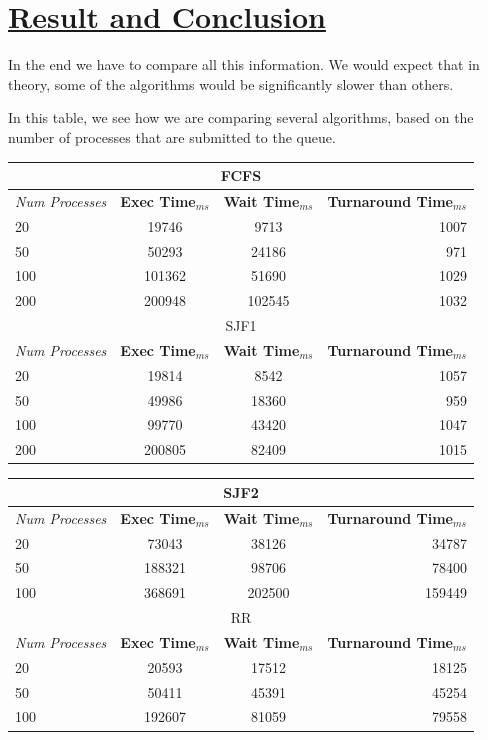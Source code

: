 \documentclass{article}
\begin{document}
\section{\underline{Result and Conclusion}}

In the end we have to compare all this information. We would expect that in theory, some of the algorithms would be significantly slower than others.

In this table, we see how we are comparing several algorithms, based on the number of processes that are submitted to the queue.

\begin{center}
  \begin{tabular}{l|c|c|r}
    \multicolumn{4}{c}{FCFS} \\
    \toprule
    \textit{Num Processes} & \textbf{Exec Time}$_{ms}$ & \textbf{Wait Time}$_{ms}$ & \textbf{Turnaround Time}$_{ms}$ \\
    \midrule
    20 & 19746 & 9713 & 1007 \\ \hline
    50 & 50293 & 24186 & 971 \\ \hline
    100 & 101362 & 51690 & 1029 \\ \hline
    200 & 200948 & 102545 & 1032 \\
    \bottomrule
    \toprule
    \multicolumn{4}{c}{SJF1} \\
    \toprule
    \textit{Num Processes} & \textbf{Exec Time}$_{ms}$ & \textbf{Wait Time}$_{ms}$ & \textbf{Turnaround Time}$_{ms}$ \\
    \midrule
    20 & 19814 & 8542 & 1057 \\ \hline
    50 & 49986 & 18360 & 959 \\ \hline
    100 & 99770 & 43420 & 1047 \\ \hline
    200 & 200805 & 82409 & 1015 \\
    \bottomrule
    \toprule
  \end{tabular}
\end{center}
\newpage
\begin{center}
  \begin{tabular}{l|c|c|r}
    \multicolumn{4}{c}{SJF2} \\
    \toprule
    \textit{Num Processes} & \textbf{Exec Time}$_{ms}$ & \textbf{Wait Time}$_{ms}$ & \textbf{Turnaround Time}$_{ms}$ \\
    \midrule
    20 & 73043 & 38126 & 34787 \\ \hline
    50 & 188321 & 98706 & 78400 \\ \hline
    100 & 368691 & 202500 & 159449 \\
    \bottomrule
    \toprule
    \multicolumn{4}{c}{RR} \\
    \toprule
    \textit{Num Processes} & \textbf{Exec Time}$_{ms}$ & \textbf{Wait Time}$_{ms}$ & \textbf{Turnaround Time}$_{ms}$ \\
    \midrule
    20 & 20593 & 17512 & 18125 \\ \hline
    50 & 50411 & 45391 & 45254 \\ \hline
    100 & 192607 & 81059 & 79558 \\
    \bottomrule
    \toprule
  \end{tabular}
\end{center}
\end{document}
